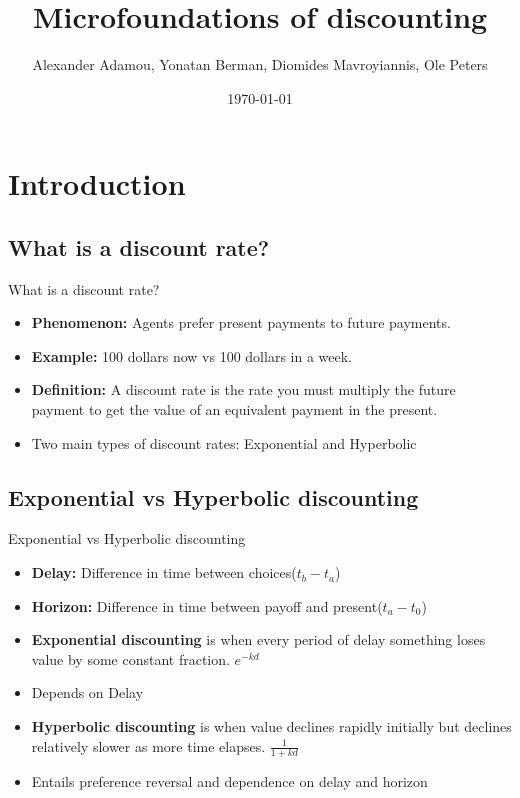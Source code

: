\documentclass{beamer}
\title[Microfoundations of discounting]{Microfoundations of discounting} %
\author{Alexander Adamou, Yonatan Berman, Diomides Mavroyiannis, Ole Peters} %
\institute[London Mathematical Laboratory, Dauphine] %
{
London Mathematical Laboratory, PSL/Paris Dauphine \\ %
\medskip%
}
\date{\today} %
\numberwithin{equation}{section}
\begin{document}
\begin{frame}
\titlepage %
\end{frame}

\setcounter{tocdepth}{1}
\section{Introduction}
\subsection{What is a discount rate?}
\begin{frame}{What is a discount rate?}
\begin{itemize}
    \item \textbf{Phenomenon:} Agents prefer present payments to future payments. 
    \item \textbf{Example:} 100 dollars now vs 100 dollars in a week.   
    \item \textbf{Definition:} A discount rate is the rate you must multiply the future payment to get the value of an equivalent payment in the present. 
    \item Two main types of discount rates: Exponential and Hyperbolic
\end{itemize}
\end{frame}

\subsection{Exponential vs Hyperbolic discounting}
\begin{frame}{Exponential vs Hyperbolic discounting}
\begin{itemize}
    \item \textbf{Delay:} Difference in time between choices($t_b-t_a$)
    \item \textbf{Horizon:} Difference in time between payoff and present($t_a-t_0$)
    \item \textbf{Exponential discounting} is when every period of delay something loses value by some constant fraction. $e^{-kd}$
    \item Depends on Delay 
    \item \textbf{Hyperbolic discounting} is when value declines rapidly initially but declines relatively slower as more time elapses. $\frac{1}{1+kd}$
    \item Entails  preference reversal and dependence on delay and horizon
\end{itemize}
\end{frame}
\end{document}

